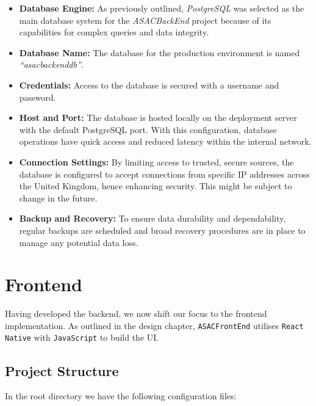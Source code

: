 \begin{itemize}
    \item \textbf{Database Engine:} As previously outlined, \textit{PostgreSQL} was selected as the main database system for the \textit{ASACBackEnd} project because of its capabilities for complex queries and data integrity.
    \item \textbf{Database Name:} The database for the production environment is named \textit{``asacbackenddb''}.
    \item \textbf{Credentials:} Access to the database is secured with a username and password.
    \item \textbf{Host and Port:} The database is hosted locally on the deployment server with the default PostgreSQL port. With this configuration, database operations have quick access and reduced latency within the internal network.
    \item \textbf{Connection Settings:} By limiting access to trusted, secure sources, the database is configured to accept connections from specific IP addresses across the United Kingdom, hence enhancing security. This might be subject to change in the future.
    \item \textbf{Backup and Recovery:} To ensure data durability and dependability, regular backups are scheduled and broad recovery procedures are in place to manage any potential data loss.
\end{itemize}

\section{Frontend}

Having developed the backend, we now shift our focus to the frontend implementation. As outlined in the design chapter, \texttt{ASACFrontEnd} utilises \texttt{React Native} with \texttt{JavaScript} to build the UI. 

\subsection{Project Structure}

In the root directory we have the following configuration files:

